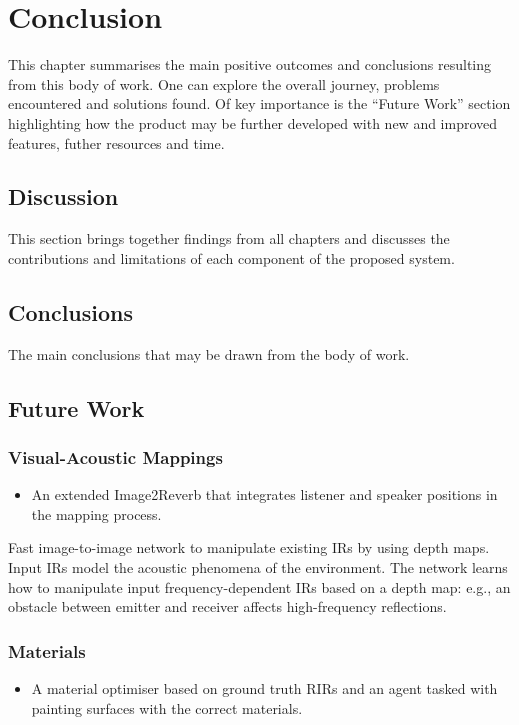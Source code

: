\chapter{Conclusion}\label{ch:Conclusion}

This chapter summarises the main positive outcomes and conclusions resulting from this body of work. One can explore the overall journey, problems encountered and solutions found. Of key importance is the ``Future Work'' section highlighting how the product may be further developed with new and improved features, futher resources and time. 

\section{Discussion}
This section brings together findings from all chapters and discusses the contributions and limitations of each component of the proposed system.
\subsection{}


\section{Conclusions}

The main conclusions that may be drawn from the body of work.

\section{Future Work}

\subsection{Visual-Acoustic Mappings}
\begin{itemize}
    \item An extended Image2Reverb that integrates listener and speaker positions in the mapping process.
\end{itemize}

Fast image-to-image network to manipulate existing IRs by using depth maps. Input IRs model the acoustic phenomena of the environment. The network learns how to manipulate input frequency-dependent IRs based on a depth map: e.g., an obstacle between emitter and receiver affects high-frequency reflections.

\subsection{Materials}
\begin{itemize}
    \item A material optimiser based on ground truth RIRs and an agent tasked with painting surfaces with the correct materials.
\end{itemize}

